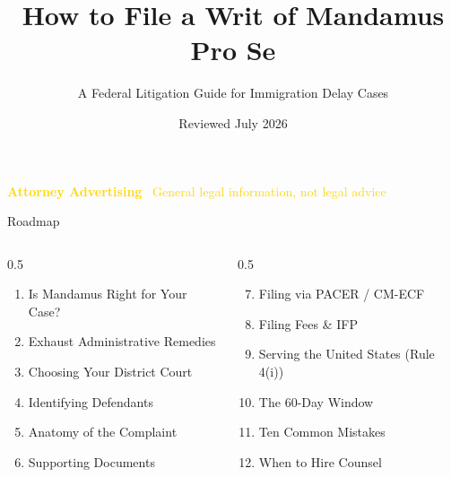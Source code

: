\documentclass[aspectratio=169,11pt]{beamer}
\title[Pro Se Mandamus Guide]{How to File a Writ of Mandamus Pro Se}
\subtitle{A Federal Litigation Guide for Immigration Delay Cases}
\author{}
\date{Reviewed July 2026}
\begin{document}
	
	\begin{frame}[plain]
		\titlepage
		\vfill
		\begin{center}
			\small\textcolor{gold}{\textbf{Attorney Advertising} \textperiodcentered\ General legal information, not legal advice}
		\end{center}
	\end{frame}
	
	\begin{frame}{Roadmap}
		\begin{columns}[T]
			\begin{column}{0.5\textwidth}
				\begin{enumerate}
					\item Is Mandamus Right for Your Case?
					\item Exhaust Administrative Remedies
					\item Choosing Your District Court
					\item Identifying Defendants
					\item Anatomy of the Complaint
					\item Supporting Documents
				\end{enumerate}
			\end{column}
			\begin{column}{0.5\textwidth}
				\begin{enumerate}\setcounter{enumi}{6}
					\item Filing via PACER / CM-ECF
					\item Filing Fees \& IFP
					\item Serving the United States (Rule 4(i))
					\item The 60-Day Window
					\item Ten Common Mistakes
					\item When to Hire Counsel
				\end{enumerate}
			\end{column}
		\end{columns}
	\end{frame}
	
\end{document}
